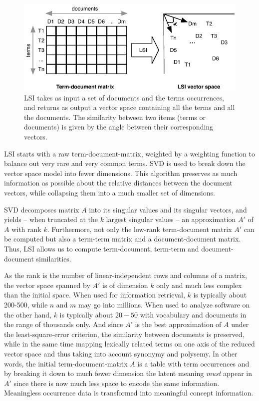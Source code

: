 \begin{figure}[htb]
\begin{center}
\includegraphics[width=.8\columnwidth]{fig/hapax-lsi}
\caption{LSI takes as input a set of documents and the terms occurrences, and returns as output a vector space containing all the terms and all the documents. The similarity between two items (\ie terms or documents) is given by the angle between their corresponding vectors.}
\label{fig:lsi}
\end{center}
\end{figure}

LSI starts with a raw term-document-matrix, weighted by a weighting function to balance out very rare and very common terms. SVD is used to break down the vector space model into fewer dimensions. This algorithm preserves as much information as possible about the relative distances between the document vectors, while collapsing them into a much smaller set of dimensions.

SVD decomposes matrix $A$ into its singular values and its singular vectors, and yields -- when truncated at the $k$ largest singular values -- an approximation $A'$ of $A$ with rank $k$. Furthermore, not only the low-rank term-document matrix $A'$ can be computed but also a term-term matrix and a document-document matrix. Thus, LSI allows us to compute term-document, term-term and document-document similarities.

As the rank is the number of linear-independent rows and columns of a matrix, the vector space spanned by $A'$ is of dimension $k$ only and much less complex than the initial space. When used for information retrieval, $k$ is typically about 200-500, while $n$ and $m$ may go into millions. When used to analyze software on the other hand, $k$ is typically about $20-50$ with vocabulary and documents in the range of thousands only. And since $A'$ is the best approximation of $A$ under the least-square-error criterion, the similarity between documents is preserved, while in the same time mapping lexically related terms on one axis of the reduced vector space and thus taking into account synonymy and polysemy. In other words, the initial term-document-matrix $A$ is a table with term occurrences and by breaking it down to much fewer dimension the latent meaning \emph{must} appear in $A'$ since there is now much less space to encode the same information. Meaningless occurrence data is transformed into meaningful concept information.

